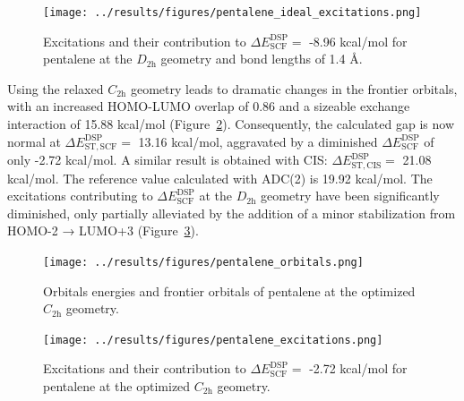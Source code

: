 \documentclass[
  number,
  3p]{elsarticle}
\newcommand{\DeltaE}[2][]{\Delta E^{\mathrm{#1}}_{\mathrm{#2}}}
\newcommand{\DeltaEST}[2][]{\Delta E^{\mathrm{#1}}_{\mathrm{ST,#2}}}
\begin{document}
\begin{figure}

{\centering \texttt{[image: ../results/figures/pentalene\_ideal\_excitations.png]}

}

\caption{\label{fig-pentalene-ideal-excitations}Excitations and their
contribution to \(\DeltaE[DSP]{SCF}=\) -8.96 kcal/mol for pentalene at
the \(D_\mathrm{2h}\) geometry and bond lengths of 1.4 Å.}

\end{figure}

Using the relaxed \(C_\mathrm{2h}\) geometry leads to dramatic changes
in the frontier orbitals, with an increased HOMO-LUMO overlap of 0.86
and a sizeable exchange interaction of 15.88 kcal/mol
(Figure~\ref{fig-pentalene-orbitals}). Consequently, the calculated gap
is now normal at \(\DeltaEST[DSP]{SCF}=\) 13.16 kcal/mol, aggravated by
a diminished \(\DeltaE[DSP]{SCF}\) of only -2.72 kcal/mol. A similar
result is obtained with CIS: \(\DeltaEST[DSP]{CIS}=\) 21.08 kcal/mol.
The reference value calculated with ADC(2) is 19.92 kcal/mol. The
excitations contributing to \(\DeltaE[DSP]{SCF}\) at the
\(D_\mathrm{2h}\) geometry have been significantly diminished, only
partially alleviated by the addition of a minor stabilization from
HOMO-2 → LUMO+3 (Figure~\ref{fig-pentalene-excitations}).

\begin{figure}

{\centering \texttt{[image: ../results/figures/pentalene\_orbitals.png]}

}

\caption{\label{fig-pentalene-orbitals}Orbitals energies and frontier
orbitals of pentalene at the optimized \(C_\mathrm{2h}\) geometry.}

\end{figure}

\begin{figure}

{\centering \texttt{[image: ../results/figures/pentalene\_excitations.png]}

}

\caption{\label{fig-pentalene-excitations}Excitations and their
contribution to \(\DeltaE[DSP]{SCF}=\) -2.72 kcal/mol for pentalene at
the optimized \(C_\mathrm{2h}\) geometry.}

\end{figure}
\end{document}
